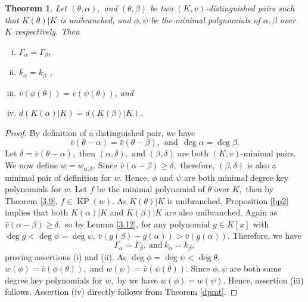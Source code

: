 \documentclass[11pt]{amsart}
\newtheorem{theorem}{Theorem}[section]
\theoremstyle{definition}
\theoremstyle{remark}
\numberwithin{equation}{section}
\begin{document}
	\begin{theorem}\label{dpmt2}
		Let $(\theta,\alpha),$ and $(\theta,\beta)$ be two $(K,v)$-distinguished pairs such that $K(\theta)|K$ is unibranched, and $\phi, \psi$ be the minimal polynomials of $\alpha, \beta$ over $K$  respectively. Then
		\begin{enumerate}[(i)]
			\item $\Gamma_\alpha=\Gamma_\beta$,
			\item $k_\alpha=k_\beta$ ,
			\item $\bar{v}(\phi(\theta))=\bar{v}(\psi(\theta))$, and
			\item $d(K(\alpha)|K)=d(K(\beta)|K).$
		\end{enumerate}
	\end{theorem}
	\begin{proof}
		By definition of a distinguished pair, we have \[\bar{v}(\theta-\alpha)=\bar{v}(\theta-\beta), \ \ \text{and}\ \ \deg \alpha=\deg \beta.\] Let $\delta=\bar{v}(\theta-\alpha),$ then $(\alpha,\delta),$ and $(\beta,\delta)$ are both $(K,v)$-minimal pairs. We now define $w=w_{\alpha,\delta}.$ Since $\bar{v}(\alpha-\beta)\geq \delta,$ therefore, $(\beta,\delta)$ is also a minimal pair of definition for $w.$ Hence, $\phi$ and $\psi$ are both minimal degree key polynomials for $w.$ Let $f$ be the minimal polynomial of $\theta$ over $K,$ then by Theorem \ref{3.9}, $f\in\operatorname{KP}(w).$ As  $K(\theta)|K$ is unibranched, Proposition \ref{bp2} implies that both $K(\alpha)|K$ and $K(\beta)|K$ are also unibranched. Again as $\bar{v}(\alpha-\beta)\geq  \delta,$ so by Lemma \ref{3.12}, for any polynomial $g\in K[x]$ with $\deg g<\deg \phi=\deg \psi$, $\bar{v}(g(\beta)-g(\alpha))>\bar{v}(g(\alpha)).$ Therefore, we have \[\Gamma_\alpha = \Gamma_\beta, \ \text {and} \ k_\alpha= k_\beta,\] proving assertions (i) and (ii).
		As $\deg \phi=\deg \psi < \deg \theta,$ $w(\phi)=\bar{v}(\phi(\theta)),$ and $w(\psi)=\bar{v}(\psi(\theta)).$ Since $\phi, \psi$ are both same degree key polynomials for $w,$ by \cite[Theorem 3.9]{EN4} we have $w(\phi)=w(\psi)$.  Hence, assertion (iii) follows. Assertion (iv) directly follows from Theorem \ref{dpmt}.
		\end{proof}
		
\end{document}
